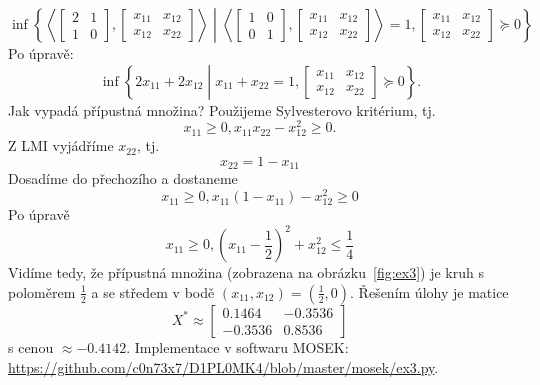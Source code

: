 \begin{pr}
    \begin{equation}\tag{P3}
        \inf \left\{
            \left\langle
            \begin{bmatrix}
                2 & 1 \\
                1 & 0
            \end{bmatrix},
            \begin{bmatrix}
                x_{11} & x_{12} \\
                x_{12} & x_{22}
            \end{bmatrix}
            \right\rangle \middle|
            \left\langle
            \begin{bmatrix}
                1 & 0 \\
                0 & 1
            \end{bmatrix},
            \begin{bmatrix}
                x_{11} & x_{12} \\
                x_{12} & x_{22}
            \end{bmatrix}
            \right\rangle = 1,
            \begin{bmatrix}
                x_{11} & x_{12} \\
                x_{12} & x_{22}
            \end{bmatrix} \succeq 0
        \right\}
        \label{eq:P3}
    \end{equation}
    Po úpravě:
    $$
        \inf \left\{
            2 x_{11} + 2 x_{12} \middle| x_{11} + x_{22} = 1, 
            \begin{bmatrix}
                x_{11} & x_{12} \\
                x_{12} & x_{22}
            \end{bmatrix} \succeq 0
        \right\}.
    $$
    Jak vypadá přípustná množina? Použijeme Sylvesterovo kritérium, tj.
    $$
        x_{11} \geq 0, x_{11} x_{22} - x_{12}^2 \geq 0.
    $$
    Z LMI vyjádříme $x_{22}$, tj.
    $$
        x_{22} = 1 - x_{11}
    $$
    Dosadíme do přechozího a dostaneme
    $$
        x_{11} \geq 0, x_{11} \left(1 - x_{11}\right) - x_{12}^2 \geq 0
    $$
    Po úpravě
    $$
        x_{11} \geq 0, \left(x_{11} - \frac{1}{2}\right)^2 + x_{12}^2 \leq \frac{1}{4}
    $$
    Vidíme tedy, že přípustná množina (zobrazena na obrázku~\ref{fig:ex3}) je kruh s poloměrem $\frac{1}{2}$ a se středem v bodě $(x_{11}, x_{12}) = (\frac{1}{2}, 0)$. Řešením úlohy je matice
    $$
        X^* \approx
        \begin{bmatrix}
            0.1464  & -0.3536 \\
            -0.3536 &  0.8536
        \end{bmatrix}
    $$
    s cenou $\approx -0.4142$. Implementace v softwaru MOSEK: \url{https://github.com/c0n73x7/D1PL0MK4/blob/master/mosek/ex3.py}.
\end{pr}

